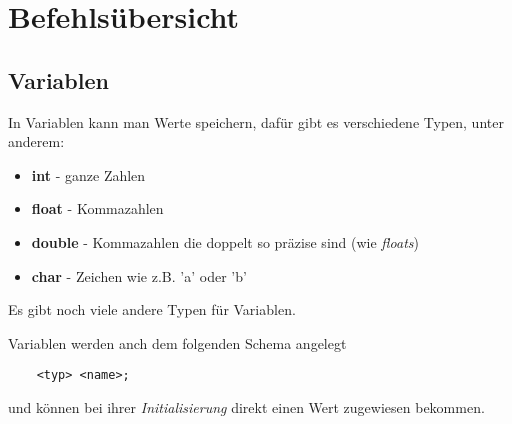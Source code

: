 \documentclass[c_worksheet.tex]{subfiles}
\begin{document}
	
\chapter{Befehlsübersicht} 

\section{Variablen}

In Variablen kann man Werte speichern, dafür gibt es verschiedene Typen, unter anderem:

\begin{itemize}
 	\item \textbf{int} - ganze Zahlen
 	\item \textbf{float} - Kommazahlen
 	\item \textbf{double} - Kommazahlen die doppelt so präzise sind (wie \emph{floats})
 	\item \textbf{char} - Zeichen wie z.B. 'a' oder 'b' 
 \end{itemize} 

Es gibt noch viele andere Typen für Variablen.

Variablen werden anch dem folgenden Schema angelegt

\begin{lstlisting}
	<typ> <name>;
\end{lstlisting}

und können bei ihrer \emph{Initialisierung} direkt einen Wert zugewiesen bekommen.

 
\end{document}
